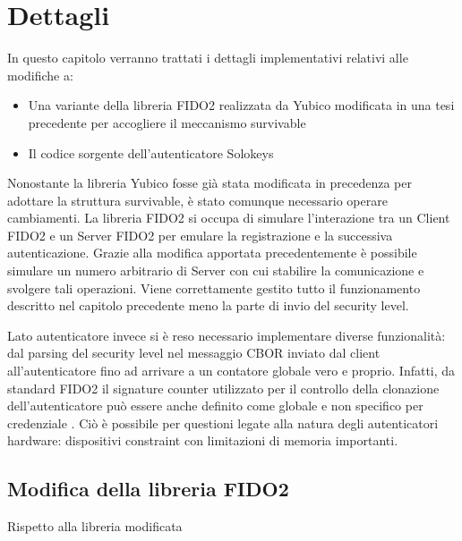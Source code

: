 \chapter{Dettagli}
\label{dettagli}

In questo capitolo verranno trattati i dettagli implementativi relativi alle modifiche a:
\begin{itemize}
	\item Una variante della libreria FIDO2 realizzata da Yubico modificata in una tesi precedente per accogliere il meccanismo survivable \cite{yubico:fido}
	\item Il codice sorgente dell'autenticatore Solokeys \cite{solokeys:code}
\end{itemize}

Nonostante la libreria Yubico fosse già stata modificata in precedenza per adottare la struttura survivable, è stato comunque necessario operare cambiamenti. La libreria FIDO2 si occupa di simulare l'interazione tra un Client FIDO2 e un Server FIDO2 per emulare la registrazione e la successiva autenticazione. Grazie alla modifica apportata precedentemente è possibile simulare un numero arbitrario di Server con cui stabilire la comunicazione e svolgere tali operazioni. Viene correttamente gestito tutto il funzionamento descritto nel capitolo precedente meno la parte di invio del security level.

Lato autenticatore invece si è reso necessario implementare diverse funzionalità: dal parsing del security level nel messaggio CBOR inviato dal client all'autenticatore fino ad arrivare a un contatore globale vero e proprio. Infatti, da standard FIDO2 il signature counter utilizzato per il controllo della clonazione dell'autenticatore può essere anche definito come globale e non specifico per credenziale \cite{fido:signature_counter}. Ciò è possibile per questioni legate alla natura degli autenticatori hardware: dispositivi constraint con limitazioni di memoria importanti.

\section{Modifica della libreria FIDO2}
\label{modifica_fido}

Rispetto alla libreria modificata 
